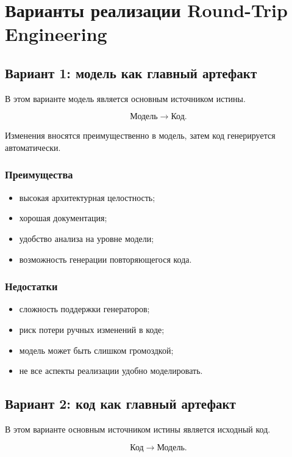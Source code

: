 \documentclass[12pt,a4paper]{article}
\begin{document}
\section{Варианты реализации Round-Trip Engineering}

\subsection{Вариант 1: модель как главный артефакт}

В этом варианте модель является основным источником истины.

\[
\text{Модель} \rightarrow \text{Код}.
\]

Изменения вносятся преимущественно в модель, затем код генерируется автоматически.

\subsubsection*{Преимущества}
\begin{itemize}
    \item высокая архитектурная целостность;
    \item хорошая документация;
    \item удобство анализа на уровне модели;
    \item возможность генерации повторяющегося кода.
\end{itemize}

\subsubsection*{Недостатки}
\begin{itemize}
    \item сложность поддержки генераторов;
    \item риск потери ручных изменений в коде;
    \item модель может быть слишком громоздкой;
    \item не все аспекты реализации удобно моделировать.
\end{itemize}

\subsection{Вариант 2: код как главный артефакт}

В этом варианте основным источником истины является исходный код.

\[
\text{Код} \rightarrow \text{Модель}.
\]
\end{document}

